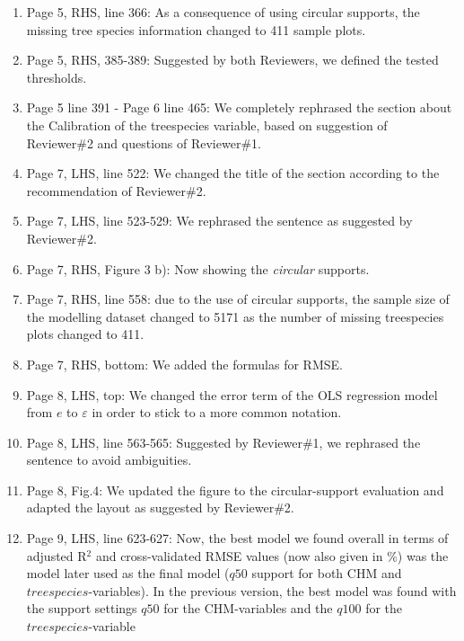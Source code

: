 \documentclass{article}
\begin{document}
\begin{enumerate}
	\item Page 5, RHS, line 366: As a consequence of using circular supports, the missing tree species information changed to 411 sample plots.
	
	\item Page 5, RHS, 385-389: Suggested by both Reviewers, we defined the tested thresholds.
	
	\item Page 5 line 391 - Page 6 line 465: We completely rephrased the section about the Calibration of the treespecies variable, based on suggestion of Reviewer\#2 and questions of Reviewer\#1.
	
	\item Page 7, LHS, line 522: We changed the title of the section according to the recommendation of Reviewer\#2.
	
	\item Page 7, LHS, line 523-529: We rephrased the sentence as suggested by Reviewer\#2.
	
	\item Page 7, RHS, Figure 3 b): Now showing the \textit{circular} supports.
	
	\item Page 7, RHS, line 558: due to the use of circular supports,  the sample size of the modelling dataset changed to 5171 as the number of missing treespecies plots changed to 411. 
	
	\item Page 7, RHS, bottom: We added the formulas for RMSE.
	
	\item Page 8, LHS, top: We changed the error term of the OLS regression model from $e$ to $\varepsilon$ in order to stick to a more common notation.
	
	\item Page 8, LHS, line 563-565: Suggested by Reviewer\#1, we rephrased the sentence to avoid ambiguities.
	
	\item Page 8, Fig.4: We updated the figure to the circular-support evaluation and adapted the layout as suggested by Reviewer\#2.
	
	\item Page 9, LHS, line 623-627: Now, the best model we found overall in terms of adjusted R$^2$ and cross-validated RMSE values (now also given in \%) was the model later used as the final model ($q50$ support for both CHM and $treespecies$-variables). In the previous version, the best model was found with the support settings $q50$ for the CHM-variables and the $q100$ for the $treespecies$-variable
	

\end{enumerate}
\end{document}

